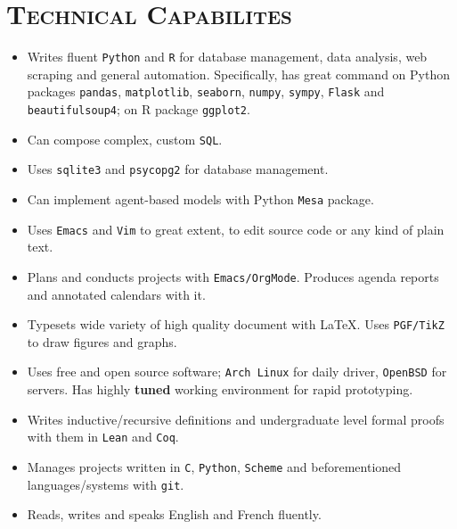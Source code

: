 \documentclass[oneside, 11pt]{memoir}
\begin{document}
\section*{\textsc{Technical Capabilites}}
\begin{itemize}[leftmargin=*]
  \item Writes fluent \texttt{Python} and \texttt{R} for database
    management, data analysis, web scraping and general automation.
    Specifically, has great command on Python packages \texttt{pandas},
    \texttt{matplotlib}, \texttt{seaborn}, \texttt{numpy},
    \texttt{sympy}, \texttt{Flask} and \texttt{beautifulsoup4}; on R
    package \texttt{ggplot2}.
  \item Can compose complex, custom \texttt{SQL}.
  \item Uses \texttt{sqlite3} and \texttt{psycopg2} for database
    management.
  \item Can implement agent-based models with Python \texttt{Mesa}
    package.
  \item Uses \texttt{Emacs} and \texttt{Vim} to great extent, to edit
  source code or any kind of plain text.
  \item Plans and conducts projects with \texttt{Emacs/OrgMode}.
  Produces agenda reports and annotated calendars with it.
  \item Typesets wide variety of high quality document with \LaTeX. Uses
  \texttt{PGF/TikZ} to draw figures and graphs.
  \item Uses free and open source software; \texttt{Arch Linux} for daily
    driver, \texttt{OpenBSD} for servers. Has highly \textbf{tuned}
    working environment for rapid prototyping.
  \item Writes inductive/recursive definitions and undergraduate level
    formal proofs with them in \texttt{Lean} and \texttt{Coq}.
  \item Manages projects written in \texttt{C}, \texttt{Python},
  \texttt{Scheme} and beforementioned languages/systems with
  \texttt{git}.
  \item Reads, writes and speaks English and French fluently.
\end{itemize}
\pagebreak
\end{document}
